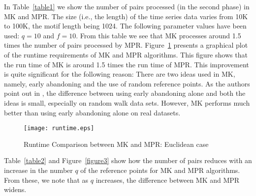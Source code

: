 \documentclass{article}
\theoremstyle{definition}
\theoremstyle{remark}
\begin{document}
In Table~\ref{table1} we show the number of pairs processed (in the second phase) in MK and MPR.  The size (i.e., the length)
 of the time series data varies from 10K to 100K, the motif length being 1024. The following parameter values have been used: $q = 10$ and $f=10$.
 From this table we see that MK processes around 1.5 times the number of pairs processed by MPR.
Figure~\ref{figure2} presents a graphical plot of the runtime requirements of MK and MPR algorithms. This figure shows that the run time of MK is around 1.5 times the run time of MPR. This improvement is quite significant for the following reason: There are two ideas used in MK, namely, early abandoning and the use of random reference points. As the authors point out in \cite{AEQSB09}, the difference between using early abandoning alone and both the ideas is small, especially on random walk data sets. However, MK performs much better than using early abandoning alone on real datasets.

\begin{figure}[h]
\texttt{[image: runtime.eps]}
\caption{Runtime Comparison between MK and MPR: Euclidean case}\label{figure2}
\end{figure}

Table~\ref{table2} and Figure~\ref{figure3} show how the number of pairs  reduces with an increase in the number $q$ of the reference points for MK and MPR algorithms. From these, we note that as $q$ increases, the difference between MK and MPR widens.
\end{document}

